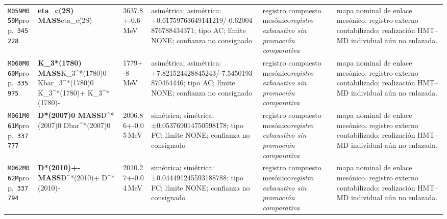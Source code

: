 \begin{landscape}
\begin{longtable}{L{1.85cm}L{4.45cm}L{2.35cm}L{4.05cm}L{3.35cm}L{7.15cm}}
\texttt{M059}\newline \texttt{M059M}\newline prop.\ \texttt{345228} & \textbf{eta\_\allowbreak{}c(2S) MASS}\newline eta\_\allowbreak{}c(2S) & 3637.8+-0.6\,MeV & asimétrica; asimétrica: +0.61759763649141219/-0.62004876788434371; tipo AC; límite NONE; confianza no consignado & registro compuesto mesónico\newline \emph{registro exhaustivo sin promoción comparativa} & mapa nominal de enlace mesónico. registro externo contabilizado; realización HMT--MD individual aún no enlazada. \\
\texttt{M060}\newline \texttt{M060M}\newline prop.\ \texttt{335975} & \textbf{K\_\allowbreak{}3*(1780) MASS}\newline K\_\allowbreak{}3\textasciicircum{}*(1780)0 \textbar{}\allowbreak{} Kbar\_\allowbreak{}3\textasciicircum{}*(1780)0 \textbar{}\allowbreak{} K\_\allowbreak{}3\textasciicircum{}*(1780)+ \textbar{}\allowbreak{} K\_\allowbreak{}3\textasciicircum{}*(1780)- & 1779+-8\,MeV & asimétrica; asimétrica: +7.821524428845243/-7.5450193870464446; tipo AC; límite NONE; confianza no consignado & registro compuesto mesónico\newline \emph{registro exhaustivo sin promoción comparativa} & mapa nominal de enlace mesónico. registro externo contabilizado; realización HMT--MD individual aún no enlazada. \\
\texttt{M061}\newline \texttt{M061M}\newline prop.\ \texttt{337777} & \textbf{D*(2007)0 MASS}\newline D\textasciicircum{}*(2007)0 \textbar{}\allowbreak{} Dbar\textasciicircum{}*(2007)0 & 2006.86+-0.05\,MeV & simétrica; simétrica: ±0.053769014750598178; tipo FC; límite NONE; confianza no consignado & registro compuesto mesónico\newline \emph{registro exhaustivo sin promoción comparativa} & mapa nominal de enlace mesónico. registro externo contabilizado; realización HMT--MD individual aún no enlazada. \\
\texttt{M062}\newline \texttt{M062M}\newline prop.\ \texttt{337794} & \textbf{D*(2010)+- MASS}\newline D\textasciicircum{}*(2010)+ \textbar{}\allowbreak{} D\textasciicircum{}*(2010)- & 2010.27+-0.04\,MeV & simétrica; simétrica: ±0.044491245593188788; tipo FC; límite NONE; confianza no consignado & registro compuesto mesónico\newline \emph{registro exhaustivo sin promoción comparativa} & mapa nominal de enlace mesónico. registro externo contabilizado; realización HMT--MD individual aún no enlazada. \\

\end{longtable}
\end{landscape}
